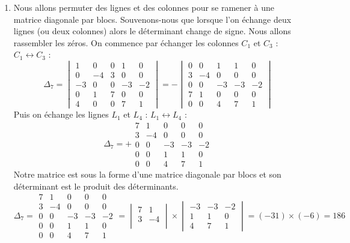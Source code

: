 {{\begin{enumerate}
  \item Nous allons permuter des lignes et des colonnes pour se ramener à une matrice diagonale par blocs.
Souvenons-nous que lorsque l'on échange deux lignes (ou deux colonnes) alors le déterminant change de signe.
Nous allons rassembler les zéros.
On commence par échanger les colonnes $C_1$ et $C_3$ : $C_1\leftrightarrow C_3$ :
$$\Delta_7=
\begin{vmatrix}
1&0&0&1&0 \\ 0&-4&3&0&0 \\ -3&0&0&-3&-2 \\ 0&1&7&0&0 \\ 4&0&0&7&1  
\end{vmatrix}=
- \begin{vmatrix}
0&0&1&1&0 \\ 3&-4&0&0&0 \\ 0&0&-3&-3&-2 \\ 7&1&0&0&0 \\ 0&0&4&7&1  
\end{vmatrix}$$
Puis on échange les lignes $L_1$ et $L_4$ : $L_1\leftrightarrow L_4$ :
$$\Delta_7=+\begin{array}{|ccccc|} 
7&1&0&0&0 \\ 3&-4&0&0&0 \\  0&0&-3&-3&-2 \\ 0&0&1&1&0 \\ 0&0&4&7&1  
\end{array}$$
Notre matrice est sous la forme d'une matrice diagonale par blocs
 et son déterminant est le produit des déterminants.
$$\Delta_7=\begin{array}{|cc|ccc|} 
7&1&0&0&0 \\ 3&-4&0&0&0 \\ \hline 0&0&-3&-3&-2 \\ 0&0&1&1&0 \\ 0&0&4&7&1  
\end{array}
= \begin{vmatrix}
 7&1 \\  3&-4 \\  
  \end{vmatrix} \times
\begin{vmatrix}
 -3&-3&-2 \\  1&1&0 \\  4&7&1  
  \end{vmatrix}
= (-31)\times (-6) = 186
$$

\end{enumerate}}
}